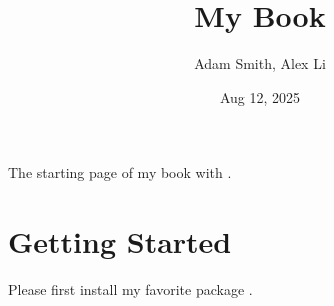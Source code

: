 \documentclass[letterpaper,11pt,english]{sphinxmanual}
\title{My Book}
\date{Aug 12, 2025}
\author{Adam Smith, Alex Li}
\begin{document}
\pagestyle{empty}
\sphinxmaketitle
\pagestyle{plain}
\sphinxtableofcontents
\pagestyle{normal}
\label{\detokenize{index::doc}}


\sphinxAtStartPar
The starting page of my book with .

\sphinxstepscope


\chapter{Getting Started}
\label{\detokenize{get_started:getting-started}}\label{\detokenize{get_started::doc}}
\sphinxAtStartPar
Please first install my favorite package .



\renewcommand{\indexname}{Index}
\printindex
\end{document}
